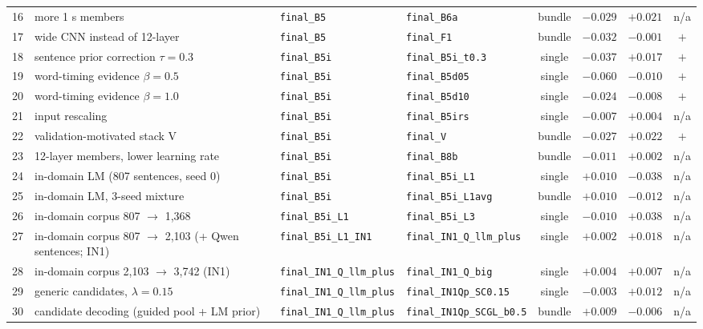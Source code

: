 \begin{tabular}{rlllcrrc}
    16 & more 1 s members & \texttt{final\_B5} & \texttt{final\_B6a} & bundle & $-0.029$ & $+0.021$ & n/a \\
    17 & wide CNN instead of 12-layer & \texttt{final\_B5} & \texttt{final\_F1} & bundle & $-0.032$ & $-0.001$ & $+$ \\
    18 & sentence prior correction $\tau{=}0.3$ & \texttt{final\_B5i} & \texttt{final\_B5i\_t0.3} & single & $-0.037$ & $+0.017$ & $+$ \\
    19 & word-timing evidence $\beta{=}0.5$ & \texttt{final\_B5i} & \texttt{final\_B5d05} & single & $-0.060$ & $-0.010$ & $+$ \\
    20 & word-timing evidence $\beta{=}1.0$ & \texttt{final\_B5i} & \texttt{final\_B5d10} & single & $-0.024$ & $-0.008$ & $+$ \\
    21 & input rescaling & \texttt{final\_B5i} & \texttt{final\_B5irs} & single & $-0.007$ & $+0.004$ & n/a \\
    22 & validation-motivated stack V & \texttt{final\_B5i} & \texttt{final\_V} & bundle & $-0.027$ & $+0.022$ & $+$ \\
    23 & 12-layer members, lower learning rate & \texttt{final\_B5i} & \texttt{final\_B8b} & bundle & $-0.011$ & $+0.002$ & n/a \\
    24 & in-domain LM (807 sentences, seed 0) & \texttt{final\_B5i} & \texttt{final\_B5i\_L1} & single & $+0.010$ & $-0.038$ & n/a \\
    25 & in-domain LM, 3-seed mixture & \texttt{final\_B5i} & \texttt{final\_B5i\_L1avg} & bundle & $+0.010$ & $-0.012$ & n/a \\
    26 & in-domain corpus 807 $\to$ 1,368 & \texttt{final\_B5i\_L1} & \texttt{final\_B5i\_L3} & single & $-0.010$ & $+0.038$ & n/a \\
    27 & in-domain corpus 807 $\to$ 2,103 (+ Qwen sentences; IN1) & \texttt{final\_B5i\_L1\_IN1} & \texttt{final\_IN1\_Q\_llm\_plus} & single & $+0.002$ & $+0.018$ & n/a \\
    28 & in-domain corpus 2,103 $\to$ 3,742 (IN1) & \texttt{final\_IN1\_Q\_llm\_plus} & \texttt{final\_IN1\_Q\_big} & single & $+0.004$ & $+0.007$ & n/a \\
    29 & generic candidates, $\lambda{=}0.15$ & \texttt{final\_IN1\_Q\_llm\_plus} & \texttt{final\_IN1Qp\_SC0.15} & single & $-0.003$ & $+0.012$ & n/a \\
    30 & candidate decoding (guided pool + LM prior) & \texttt{final\_IN1\_Q\_llm\_plus} & \texttt{final\_IN1Qp\_SCGL\_b0.5} & bundle & $+0.009$ & $-0.006$ & n/a \\
\bottomrule
\end{tabular}
